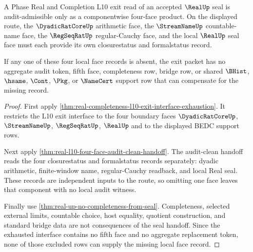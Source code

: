 \begin{theorem}
\label{thm:real-l10-exit-facewise-audit-obstruction}
A Phase Real and Completion L10 exit read of an accepted $\RealUp$ seal is audit-admissible only as a componentwise four-face product. On the displayed route, the $\DyadicRatCoreUp$ arithmetic face, the $\StreamNameUp$ countable-name face, the $\RegSeqRatUp$ regular-Cauchy face, and the local $\RealUp$ seal face must each provide its own closurestatus and formalstatus record.

If any one of these four local face records is absent, the exit packet has no aggregate audit token, fifth face, completeness row, bridge row, or shared $\BHist$, $\hsame$, $\Cont$, $\Pkg$, or $\NameCert$ support row that can compensate for the missing record.
\end{theorem}
\begin{proof}
First apply \autoref{thm:real-completeness-l10-exit-interface-exhaustion}. It restricts the L10 exit interface to the four boundary faces $\DyadicRatCoreUp$, $\StreamNameUp$, $\RegSeqRatUp$, $\RealUp$ and to the displayed BEDC support rows.

Next apply \autoref{thm:real-l10-four-face-audit-clean-handoff}. The audit-clean handoff reads the four closurestatus and formalstatus records separately: dyadic arithmetic, finite-window name, regular-Cauchy readback, and local Real seal. These records are independent inputs to the route, so omitting one face leaves that component with no local audit witness.

Finally use \autoref{thm:real-up-no-completeness-from-seal}. Completeness, selected external limits, countable choice, host equality, quotient construction, and standard bridge data are not consequences of the seal handoff. Since the exhausted interface contains no fifth face and no aggregate replacement token, none of those excluded rows can supply the missing local face record.
\end{proof}

